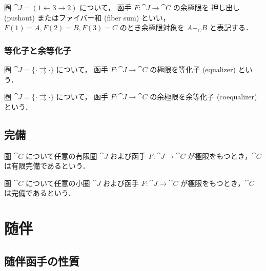 \documentclass[titlepage]{ltjsreport}
\begin{document}
\begin{definition}[押し出し]
  圏 $\cat{J}=(1\leftarrow3\rightarrow2)$ について，
  函手 $F:\cat{J}\to\cat{C}$ の余極限を
  押し出し (pushout) またはファイバー和 (fiber sum) といい，
  $F(1)=A,F(2)=B,F(3)=C$ のとき余極限対象を $A+_CB$ と表記する．
\end{definition}

\subsection{等化子と余等化子}

\begin{definition}[等化子]
  圏 $\cat{J}=\{\cdot\rightrightarrows\cdot\}$ について，
  函手 $F:\cat{J}\to\cat{C}$ の極限を等化子 (equalizer) という．
  \begin{center}
    
  \end{center}
\end{definition}

\begin{definition}[余等化子]
  圏 $\cat{J}=\{\cdot\rightrightarrows\cdot\}$ について，
  函手 $F:\cat{J}\to\cat{C}$ の余極限を余等化子 (coequalizer) という．
  \begin{center}
    
  \end{center}
\end{definition}

\section{完備}

\begin{definition}[有限完備]
  圏 $\cat{C}$ について任意の有限圏 $\cat{J}$ および函手 $F:\cat{J}\to\cat{C}$
  が極限をもつとき，$\cat{C}$ は有限完備であるという．
\end{definition}

\begin{definition}[完備]
  圏 $\cat{C}$ について任意の小圏 $\cat{J}$ および函手 $F:\cat{J}\to\cat{C}$
  が極限をもつとき，$\cat{C}$ は完備であるという．
\end{definition}

\chapter{随伴}

\section{随伴函手の性質}
\end{document}

